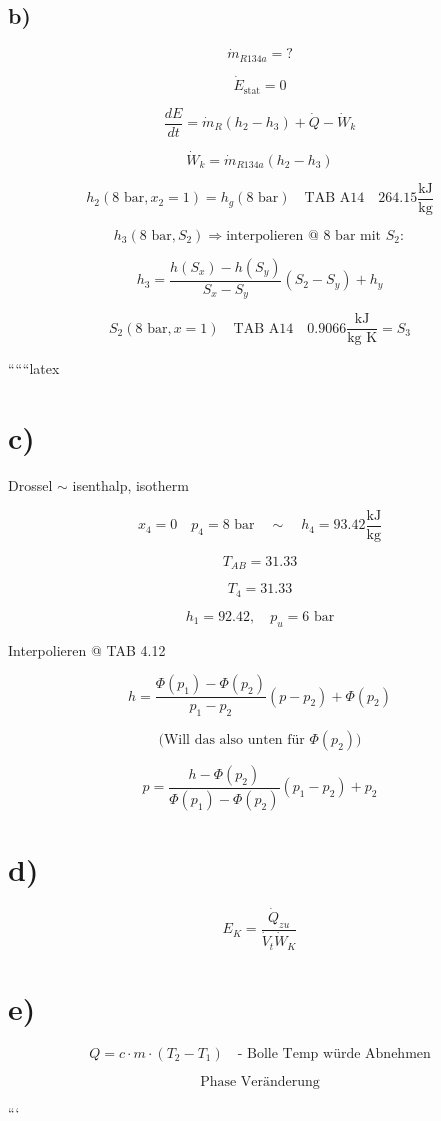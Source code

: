 \subsection*{b)}

\[
\dot{m}_{R134a} = ?
\]

\[
\dot{E}_{\text{stat}} = 0
\]

\[
\frac{dE}{dt} = \dot{m}_R (h_2 - h_3) + \dot{Q} - \dot{W}_k
\]

\[
\dot{W}_k = \dot{m}_{R134a} (h_2 - h_3)
\]

\[
h_2 (8 \text{ bar}, x_2 = 1) = h_g (8 \text{ bar}) \quad \text{TAB A14} \quad 264.15 \frac{\text{kJ}}{\text{kg}}
\]

\[
h_3 (8 \text{ bar}, S_2) \Rightarrow \text{interpolieren @ 8 bar mit } S_2 :
\]

\[
h_3 = \frac{h(S_x) - h(S_y)}{S_x - S_y} (S_2 - S_y) + h_y
\]

\[
S_2 (8 \text{ bar}, x = 1) \quad \text{TAB A14} \quad 0.9066 \frac{\text{kJ}}{\text{kg K}} = S_3
\]

``````latex


\section*{c)}

Drossel $\sim$ isenthalp, isotherm

\[
x_4 = 0 \quad p_4 = 8 \text{ bar} \quad \sim \quad h_4 = 93.42 \frac{\text{kJ}}{\text{kg}}
\]

\[
T_{AB} = 31.33
\]

\[
T_4 = 31.33
\]

\[
h_1 = 92.42, \quad p_u = 6 \text{ bar}
\]

Interpolieren @ TAB 4.12

\[
h = \frac{\Phi(p_1) - \Phi(p_2)}{p_1 - p_2} \left( p - p_2 \right) + \Phi(p_2)
\]

\[
\text{(Will das also unten für } \Phi(p_2) \text{)}
\]

\[
p = \frac{h - \Phi(p_2)}{\Phi(p_1) - \Phi(p_2)} (p_1 - p_2) + p_2
\]

\section*{d)}

\[
E_K = \frac{\dot{Q}_{zu}}{\dot{V}_t \dot{W}_K}
\]

\section*{e)}

\[
Q = c \cdot m \cdot (T_2 - T_1) \quad \text{- Bolle Temp würde Abnehmen}
\]

\[
\text{Phase Veränderung}
\]

```